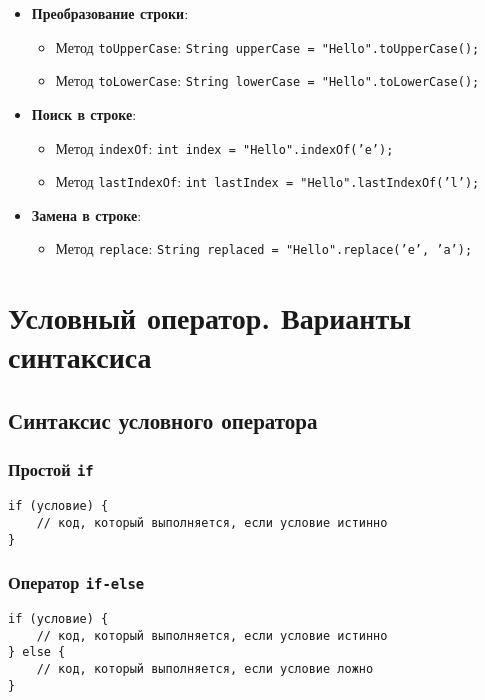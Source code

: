 \documentclass[12pt, a4paper]{article}
\begin{document}
\begin{itemize}
    \item \textbf{Преобразование строки}:
    \begin{itemize}
        \item Метод \texttt{toUpperCase}: \texttt{String upperCase = "Hello".toUpperCase();}
        \item Метод \texttt{toLowerCase}: \texttt{String lowerCase = "Hello".toLowerCase();}
    \end{itemize}

    \item \textbf{Поиск в строке}:
    \begin{itemize}
        \item Метод \texttt{indexOf}: \texttt{int index = "Hello".indexOf('e');}
        \item Метод \texttt{lastIndexOf}: \texttt{int lastIndex = "Hello".lastIndexOf('l');}
    \end{itemize}

    \item \textbf{Замена в строке}:
    \begin{itemize}
        \item Метод \texttt{replace}: \texttt{String replaced = "Hello".replace('e', 'a');}
    \end{itemize}
\end{itemize}


\section{Условный оператор. Варианты синтаксиса}
\subsection*{Синтаксис условного оператора}

\subsubsection*{Простой \texttt{if}}

\begin{verbatim}
if (условие) {
    // код, который выполняется, если условие истинно
}
\end{verbatim}

\subsubsection*{Оператор \texttt{if-else}}

\begin{verbatim}
if (условие) {
    // код, который выполняется, если условие истинно
} else {
    // код, который выполняется, если условие ложно
}
\end{verbatim}
\end{document}
